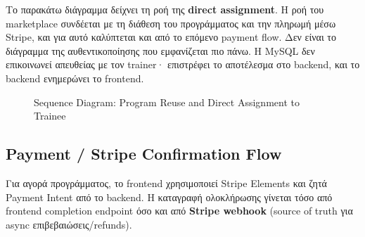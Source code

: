 \documentclass[12pt,a4paper]{report}
\begin{document}
Το παρακάτω διάγραμμα δείχνει τη ροή της \textbf{direct assignment}. Η ροή του marketplace συνδέεται με τη διάθεση του προγράμματος και την πληρωμή μέσω Stripe, και για αυτό καλύπτεται και από το επόμενο payment flow. Δεν είναι το διάγραμμα της αυθεντικοποίησης που εμφανίζεται πιο πάνω. Η MySQL δεν επικοινωνεί απευθείας με τον trainer· επιστρέφει το αποτέλεσμα στο backend, και το backend ενημερώνει το frontend.

\begin{figure}[htbp]
\centering
{}
\caption{Sequence Diagram: Program Reuse and Direct Assignment to Trainee}
\end{figure}

\subsection{Payment / Stripe Confirmation Flow}
Για αγορά προγράμματος, το frontend χρησιμοποιεί Stripe Elements και ζητά Payment Intent από το backend. Η καταγραφή ολοκλήρωσης γίνεται τόσο από frontend completion endpoint όσο και από \textbf{Stripe webhook} (source of truth για async επιβεβαιώσεις/refunds).
\end{document}
